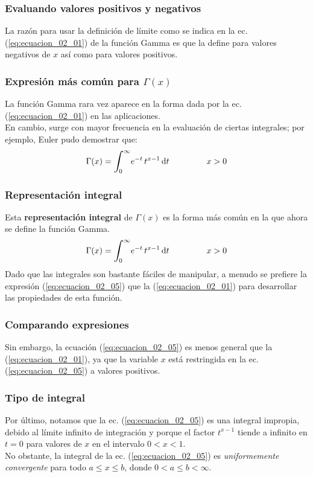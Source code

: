 \documentclass[12pt]{beamer}
\begin{document}
\begin{frame}
\frametitle{Evaluando valores positivos y negativos}
La razón para usar la definición de límite como se indica en la ec. (\ref{eq:ecuacion_02_01}) de la función Gamma es que la define para valores negativos de $x$ así como para valores positivos.
\end{frame}
\begin{frame}
\frametitle{Expresión más común para $\Gamma (x)$}
La función Gamma rara vez aparece en la forma dada por la ec. (\ref{eq:ecuacion_02_01}) en las aplicaciones.
\\
\bigskip
\pause
En cambio, surge con mayor frecuencia en la evaluación de ciertas integrales; por ejemplo, Euler pudo demostrar que:\pause
\begin{align}
\Gamma (x) = \scaleint{6ex}_{\bs 0}^{\infty} e^{-t} \, t^{x- 1} \dd{t} \hspace{1.5cm} x > 0
\label{eq:ecuacion_02_05}
\end{align}
\end{frame}
\begin{frame}
\frametitle{Representación integral}
Esta \textbf{representación integral} de $\Gamma (x)$ es la forma más común en la que ahora se define la función Gamma.
\pause
\begin{align*}
\Gamma (x) = \scaleint{6ex}_{\bs 0}^{\infty} e^{-t} \, t^{x- 1} \dd{t} \hspace{1.5cm} x > 0
\end{align*}    
\pause
Dado que las integrales son bastante fáciles de manipular, a menudo se prefiere la expresión (\ref{eq:ecuacion_02_05}) que la (\ref{eq:ecuacion_02_01}) para desarrollar las propiedades de esta función.
\end{frame}
\begin{frame}
\frametitle{Comparando expresiones}
Sin embargo, la ecuación (\ref{eq:ecuacion_02_05}) es menos general que la (\ref{eq:ecuacion_02_01}), ya que la variable $x$ está restringida en la ec. (\ref{eq:ecuacion_02_05}) a valores positivos. 
\end{frame}
\begin{frame}
\frametitle{Tipo de integral}
Por último, notamos que la ec. (\ref{eq:ecuacion_02_05}) es una integral impropia, debido al límite infinito de integración y porque el factor $t^{x-1}$ tiende a infinito en $t = 0$ para valores de $x$ en el intervalo $0 < x < 1$.
\\
\bigskip
\pause
No obstante, la integral de la ec. (\ref{eq:ecuacion_02_05}) es \emph{uniformemente convergente} para todo $a \leq x \leq b$, donde $0 < a \leq b < \infty$.
\end{frame}
\end{document}
